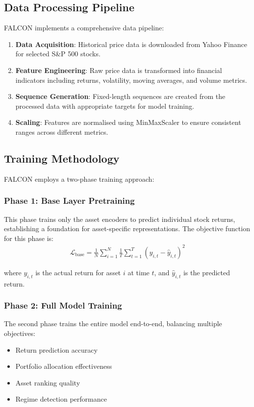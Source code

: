 \documentclass[conference]{IEEEtran}
\begin{document}
\subsection{Data Processing Pipeline}
FALCON implements a comprehensive data pipeline:

\begin{enumerate}
\item \textbf{Data Acquisition}: Historical price data is downloaded from Yahoo Finance for selected S\&P 500 stocks.
\item \textbf{Feature Engineering}: Raw price data is transformed into financial indicators including returns, volatility, moving averages, and volume metrics.
\item \textbf{Sequence Generation}: Fixed-length sequences are created from the processed data with appropriate targets for model training.
\item \textbf{Scaling}: Features are normalised using MinMaxScaler to ensure consistent ranges across different metrics.
\end{enumerate}

\subsection{Training Methodology}
FALCON employs a two-phase training approach:

\subsubsection{Phase 1: Base Layer Pretraining}
This phase trains only the asset encoders to predict individual stock returns, establishing a foundation for asset-specific representations. The objective function for this phase is:
\begin{align}
\mathcal{L}_{\text{base}} = \frac{1}{N} \sum_{i=1}^{N} \frac{1}{T} \sum_{t=1}^{T} (y_{i,t} - \hat{y}_{i,t})^2
\end{align}

where $y_{i,t}$ is the actual return for asset $i$ at time $t$, and $\hat{y}_{i,t}$ is the predicted return.

\subsubsection{Phase 2: Full Model Training}
The second phase trains the entire model end-to-end, balancing multiple objectives:
\begin{itemize}
\item Return prediction accuracy
\item Portfolio allocation effectiveness
\item Asset ranking quality
\item Regime detection performance
\end{itemize}
\end{document}
